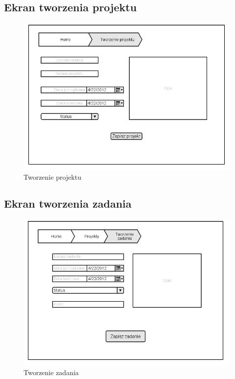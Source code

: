 \subsection{Ekran tworzenia projektu}
\begin{figure}[H]
    \centering
    \includegraphics[scale=0.7]{diagramy/intefejsy/Tworzenie_projektu.png}
    \caption{Tworzenie projektu}
    \label{fig:usecase}
\end{figure}

\subsection{Ekran tworzenia zadania}
\begin{figure}[H]
    \centering
    \includegraphics[scale=0.7]{diagramy/intefejsy/Tworzenie_zadania.png}
    \caption{Tworzenie zadania}
    \label{fig:usecase}
\end{figure}

